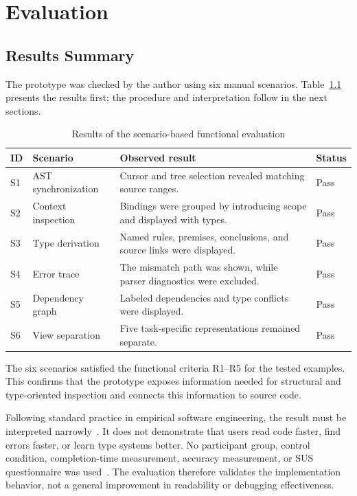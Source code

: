 ﻿\chapter{Evaluation}
\label{chap:evaluation}

\section{Results Summary}

The prototype was checked by the author using six manual scenarios. Table~\ref{tab:evaluation-results} presents the results first; the procedure and interpretation follow in the next sections.

\begin{table}[H]
\centering
\caption{Results of the scenario-based functional evaluation}
\label{tab:evaluation-results}
\begin{tabular}{p{0.8cm}p{4.0cm}p{7.7cm}p{1.5cm}}
\toprule
\textbf{ID} & \textbf{Scenario} & \textbf{Observed result} & \textbf{Status} \\
\midrule
S1 & AST synchronization & Cursor and tree selection revealed matching source ranges. & Pass \\
S2 & Context inspection & Bindings were grouped by introducing scope and displayed with types. & Pass \\
S3 & Type derivation & Named rules, premises, conclusions, and source links were displayed. & Pass \\
S4 & Error trace & The mismatch path was shown, while parser diagnostics were excluded. & Pass \\
S5 & Dependency graph & Labeled dependencies and type conflicts were displayed. & Pass \\
S6 & View separation & Five task-specific representations remained separate. & Pass \\
\bottomrule
\end{tabular}
\end{table}

The six scenarios satisfied the functional criteria R1--R5 for the tested examples. This confirms that the prototype exposes information needed for structural and type-oriented inspection and connects this information to source code.

Following standard practice in empirical software engineering, the result must be interpreted narrowly~\cite{Wohlin2012Experimentation,RunesonHost2009}. It does not demonstrate that users read code faster, find errors faster, or learn type systems better. No participant group, control condition, completion-time measurement, accuracy measurement, or SUS questionnaire was used~\cite{Brooke1996SUS,Bangor2009SUS}. The evaluation therefore validates the implementation behavior, not a general improvement in readability or debugging effectiveness.

